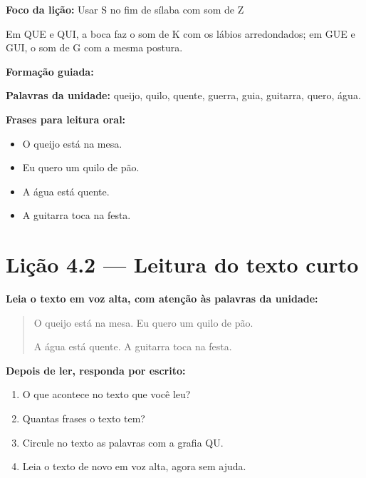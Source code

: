 \textbf{Foco da lição:} Usar S no fim de sílaba com som de Z


\begin{boquinha}
Em QUE e QUI, a boca faz o som de K com os lábios arredondados; em GUE e GUI, o som de G com a mesma postura.
\end{boquinha}

\noindent\textbf{Formação guiada:}

\begin{center}
\end{center}

\noindent\textbf{Palavras da unidade:} queijo, quilo, quente, guerra, guia, guitarra, quero, água.

\noindent\textbf{Frases para leitura oral:}
\begin{itemize}[leftmargin=1.6em]
  \item O queijo está na mesa.
  \item Eu quero um quilo de pão.
  \item A água está quente.
  \item A guitarra toca na festa.
\end{itemize}

\section{Lição 4.2 --- Leitura do texto curto}

\noindent\textbf{Leia o texto em voz alta, com atenção às palavras da unidade:}


\begin{quote}
O queijo está na mesa. Eu quero um quilo de pão.

A água está quente. A guitarra toca na festa.
\end{quote}

\textbf{Depois de ler, responda por escrito:}
\begin{enumerate}

  \item O que acontece no texto que você leu?
  \begin{center}
  \underline{\hspace{12cm}}
  \end{center}

  \item Quantas frases o texto tem?
  \begin{center}
  \underline{\hspace{12cm}}
  \end{center}

  \item Circule no texto as palavras com a grafia QU.

  \item Leia o texto de novo em voz alta, agora sem ajuda.

\end{enumerate}

